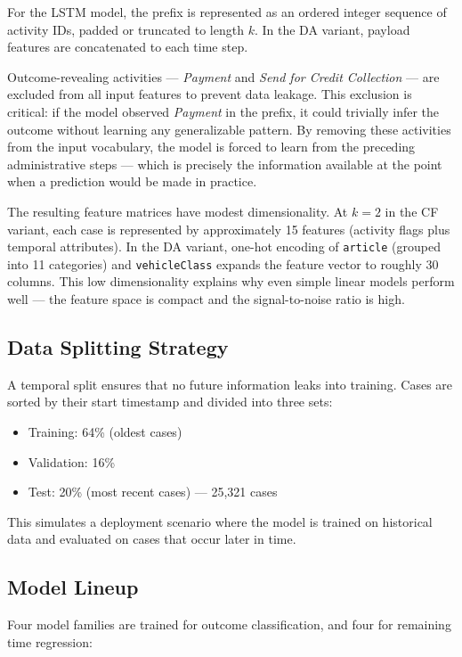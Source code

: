 For the LSTM model, the prefix is represented as an ordered integer sequence of activity IDs, padded or truncated to length $k$. In the DA variant, payload features are concatenated to each time step.

Outcome-revealing activities — \textit{Payment} and \textit{Send for Credit Collection} — are excluded from all input features to prevent data leakage. This exclusion is critical: if the model observed \textit{Payment} in the prefix, it could trivially infer the outcome without learning any generalizable pattern. By removing these activities from the input vocabulary, the model is forced to learn from the preceding administrative steps — which is precisely the information available at the point when a prediction would be made in practice.

The resulting feature matrices have modest dimensionality. At $k=2$ in the CF variant, each case is represented by approximately 15 features (activity flags plus temporal attributes). In the DA variant, one-hot encoding of \texttt{article} (grouped into 11 categories) and \texttt{vehicleClass} expands the feature vector to roughly 30 columns. This low dimensionality explains why even simple linear models perform well — the feature space is compact and the signal-to-noise ratio is high.

\subsection{Data Splitting Strategy}

A temporal split ensures that no future information leaks into training. Cases are sorted by their start timestamp and divided into three sets:

\begin{itemize}
    \item Training: 64\% (oldest cases)
    \item Validation: 16\%
    \item Test: 20\% (most recent cases) — 25,321 cases
\end{itemize}

This simulates a deployment scenario where the model is trained on historical data and evaluated on cases that occur later in time.

\subsection{Model Lineup}

Four model families are trained for outcome classification, and four for remaining time regression:

